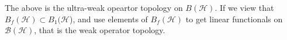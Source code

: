 \begin{proposition}
    The above is the ultra-weak opeartor topology on $B(\mathcal{H})$. If we view that $B_f(\mathcal{H})\subset B_1(\mathcal{H}$), and use elements of $B_f(\mathcal{H})$ to get linear functionals on $\mathcal{B}(\mathcal{H})$, that is the weak operator topology.
\end{proposition}

